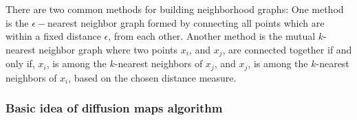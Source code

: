 There are two common methods for building neighborhood graphs:
One method is the $\epsilon-$nearest neighbor graph formed by connecting all points which are within a fixed distance $\epsilon$, from each other. Another method is the mutual $k$-nearest neighbor graph where two points $x_{i}$, and $x_{j}$, are connected together if and only if, $x_{i}$, is among the $k$-nearest neighbors of $x_{j}$, and $x_{j}$, is among the $k$-nearest neighbors of $x_{i}$, based on the chosen distance measure.


\subsubsection{Basic idea of diffusion maps algorithm}







